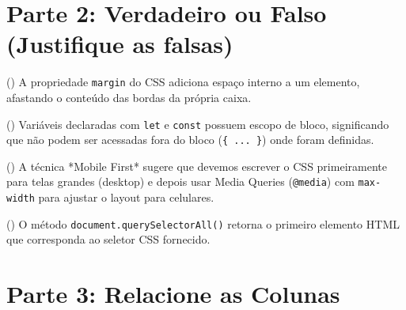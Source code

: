 \documentclass[12pt,a4paper]{article}
\newcommand{\marcar}[1]{\iftoggle{gabarito}{\textbf{\color{corGabarito}#1}}{}}
\newcommand{\justificativa}[1]{\iftoggle{gabarito}{\vspace{0.2cm}\textbf{\color{corGabarito}Justificativa:} \color{corGabarito}#1}{\vspace{0.8cm}}}
\begin{document}
\newpage
\section*{Parte 2: Verdadeiro ou Falso (Justifique as falsas)}

\begin{tcolorbox}[colback=white, colframe=azulTitulo, title=Questão 5: Box Model]
    (\marcar{F}) A propriedade \texttt{margin} do CSS adiciona espaço interno a um elemento, afastando o conteúdo das bordas da própria caixa.
    \justificativa{Falso. O \texttt{margin} adiciona espaço EXTERNO (entre a borda e outros elementos). O espaço INTERNO é o \texttt{padding}.}
\end{tcolorbox}

\begin{tcolorbox}[colback=white, colframe=azulTitulo, title=Questão 6: Escopo JS]
    (\marcar{V}) Variáveis declaradas com \texttt{let} e \texttt{const} possuem escopo de bloco, significando que não podem ser acessadas fora do bloco (\texttt{\{ ... \}}) onde foram definidas.
    \justificativa{Verdadeiro.}
\end{tcolorbox}

\begin{tcolorbox}[colback=white, colframe=azulTitulo, title=Questão 7: Responsividade]
    (\marcar{F}) A técnica *Mobile First* sugere que devemos escrever o CSS primeiramente para telas grandes (desktop) e depois usar Media Queries (\texttt{@media}) com \texttt{max-width} para ajustar o layout para celulares.
    \justificativa{Falso. A técnica Mobile First escreve o CSS base para celulares primeiro e usa Media Queries com \texttt{min-width} para adaptar o layout em telas maiores.}
\end{tcolorbox}

\begin{tcolorbox}[colback=white, colframe=azulTitulo, title=Questão 8: Manipulação DOM]
    (\marcar{F}) O método \texttt{document.querySelectorAll()} retorna o primeiro elemento HTML que corresponda ao seletor CSS fornecido.
    \justificativa{Falso. Ele retorna uma lista (NodeList) com TODOS os elementos que correspondem ao seletor. O método que retorna apenas o primeiro é o \texttt{querySelector()}.}
\end{tcolorbox}


\section*{Parte 3: Relacione as Colunas}
\end{document}
